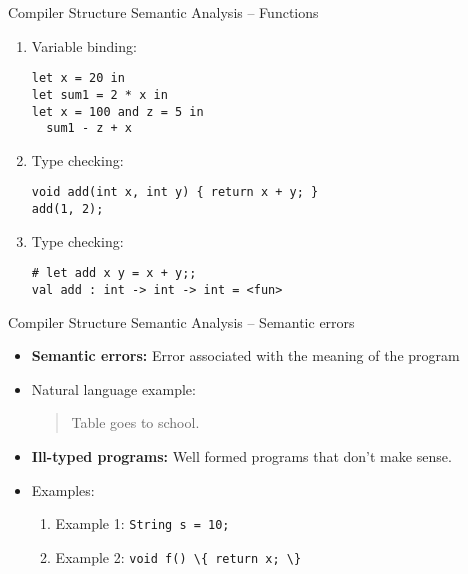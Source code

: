 \documentclass{beamer}
\begin{document}
\begin{frame}[fragile]{Compiler Structure}
{Semantic Analysis -- Functions}

\begin{enumerate}
\item Variable binding:
\begin{lstlisting}[style=camlcode]
let x = 20 in
let sum1 = 2 * x in
let x = 100 and z = 5 in
  sum1 - z + x
\end{lstlisting}
\item Type checking:
\begin{lstlisting}[style=camlcode]
void add(int x, int y) { return x + y; }
add(1, 2);
\end{lstlisting}
\item Type checking:
\begin{lstlisting}[style=camlcode]
# let add x y = x + y;;
val add : int -> int -> int = <fun>
\end{lstlisting}
\end{enumerate}
\end{frame}

\begin{frame}[fragile]{Compiler Structure}
{Semantic Analysis -- Semantic errors}

\begin{itemize}
\item \textbf{\color{BrickRed}Semantic errors:} Error associated with the meaning of the program
\item Natural language example:
\begin{quote}
Table goes to school.
\end{quote}
\pause
\item \textbf{Ill-typed programs:} Well formed programs that don't make sense.
\item Examples:
	\begin{enumerate}
	\item Example 1: \lstinline[style=javacode]|String s = 10;|
	\item Example 2: \lstinline[style=javacode]|void f() \{ return x; \}|
	\end{enumerate}
\end{itemize}
\end{frame}
\end{document}
